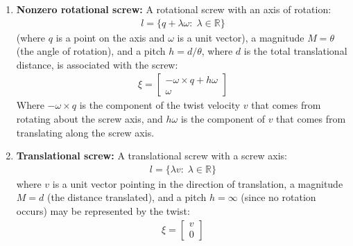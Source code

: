 \documentclass[oneside]{book}
\begin{document}
\begin{enumerate}
    \item \textbf{Nonzero rotational screw:} A rotational screw with an axis of rotation:
    \begin{align}
        l = \{ q + \lambda \omega: \; \lambda \in \mathbb{R} \}
    \end{align}
    (where $q$ is a point on the axis and $\omega$ is a unit vector), a magnitude $M = \theta$ (the angle of rotation), and a pitch $h = d/\theta$, where $d$ is the total translational distance, is associated with the screw:
    \begin{align}
        \xi = 
        \begin{bmatrix}
            -\omega \times q + h\omega\\
            \omega
        \end{bmatrix}
    \end{align}
    Where $-\omega\times q$ is the component of the twist velocity $v$ that comes from rotating about the screw axis, and $h\omega$ is the component of $v$ that comes from translating along the screw axis.
    \item \textbf{Translational screw:} A translational screw with a screw axis:
    \begin{align}
        l = \{ \lambda v: \; \lambda \in \mathbb{R} \}
    \end{align}
    where $v$ is a unit vector pointing in the direction of translation, a magnitude $M = d$ (the distance translated), and a pitch $h = \infty$ (since no rotation occurs) may be represented by the twist:
    \begin{align}
        \xi = 
        \begin{bmatrix}
            v\\
            0
        \end{bmatrix}
    \end{align}
\end{enumerate}
\end{document}
